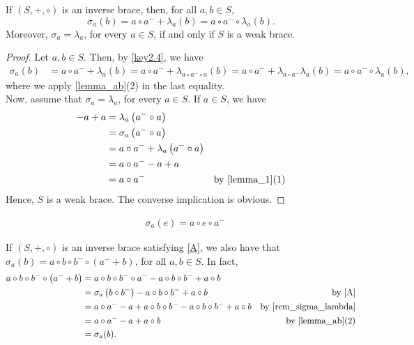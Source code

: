 \documentclass[10pt,a4paper]{amsart}
\begin{document}
\begin{prop}\label{rem_sigma_lambda}
If $(S, +, \circ)$ is an inverse brace, then, for all $a, b \in S$,
$$\sigma_a(b)=a \circ a^- + \lambda_a(b)=a \circ a^- \circ \lambda_a(b).$$
Moreover, $\sigma_a=\lambda_a$, for every $a \in S$, if and only if $S$ is a weak brace.
    \begin{proof}
        Let $a, b \in S$. Then, by \cref{key2.4}, we have
        \begin{align*}
        \sigma_a(b)&=a \circ a^-+\lambda_a( b)=a \circ a^-+\lambda_{a \circ a^- \circ a}(b)=a \circ a^-+\lambda_{a \circ a^- }\lambda_a(b)=a \circ a^- \circ \lambda_a(b),
        \end{align*}
        where we apply \cref{lemma_ab}(2) in the last equality. \\
   Now, assume that $\sigma_a=\lambda_a$, for every $a \in S$. If $a \in S$, %
 we have
   \begin{align*}
      -a+a&=\lambda_a\left(a^- \circ a\right)\\
      &=\sigma_a\left(a^- \circ a\right)\\
      &=a \circ a^- + \lambda_a\left(a^- \circ a\right)\\
      &=a \circ a^--a+a\\
      &=a \circ a^- &\mbox{by \cref{lemma_1}(1)}
   \end{align*}
   Hence, $S$ is a weak brace. The converse implication is obvious.
    \end{proof}
\end{prop}

   \begin{align}\label{A} 
    &\sigma_a(e)=a \circ e \circ a^-\tag{I}
     \end{align}

\begin{rem}\label{A*}
    If $(S, +, \circ)$ is an inverse brace satisfying \eqref{A}, we also have that $\sigma_a(b)=a \circ b \circ b^- \circ \left(a^-+b\right)$, for all $a,b \in S$. In fact, 
   \begin{align*}
       a \circ b \circ b^- \circ \left(a^-+b\right)&=a \circ b \circ b^- \circ a^--a \circ b \circ b^-+a \circ b\\
       &=\sigma_a\left(b \circ b^-\right)-a \circ b \circ b^-+a \circ b &\mbox{by \eqref{A}}\\
       &=a \circ a^--a+a \circ b \circ b^--a \circ b \circ b^-+a \circ b &\mbox{by \cref{rem_sigma_lambda}}\\
       &=a \circ a^--a+a \circ b &\mbox{by \cref{lemma_ab}(2)}\\
       &=\sigma_a(b).
   \end{align*}
\end{rem}
\end{document}
